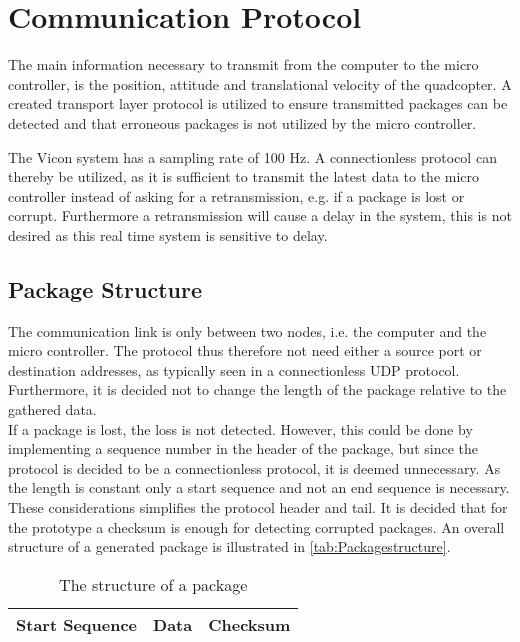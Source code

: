 \section{Communication Protocol}
The main information necessary to transmit from the computer to the micro controller, is the position, attitude and translational velocity of the quadcopter. A created transport layer protocol is utilized to ensure transmitted packages can be detected and that erroneous packages is not utilized by the micro controller.

The Vicon system has a sampling rate of 100 Hz. A connectionless protocol can thereby be utilized, as it is sufficient to transmit the latest data to the micro controller instead of asking for a retransmission, e.g. if a package is lost or corrupt. Furthermore a retransmission will cause a delay in the system, this is not desired as this real time system is sensitive to delay.

\subsection{Package Structure}
The communication link is only between two nodes, i.e. the computer and the micro controller. The protocol thus therefore not need either a source port or destination addresses, as typically seen in a connectionless UDP protocol. Furthermore, it is decided not to change the length of the package relative to the gathered data.\\
If a package is lost, the loss is not detected. However, this could be done by implementing a sequence number in the header of the package, but since the protocol is decided to be a connectionless protocol, it is deemed unnecessary. As the length is constant only a start sequence and not an end sequence is necessary. These considerations simplifies the protocol header and tail. It is decided that for the prototype a checksum is enough for detecting corrupted packages. An overall structure of a generated package is illustrated in \autoref{tab:Packagestructure}.

\begin{table}[H]\centering
\begin{tabular}{|>{\centering\arraybackslash}m{3cm}|>{\centering\arraybackslash}m{2cm}|>{\centering\arraybackslash}m{2cm}|}
\hline
Start Sequence & Data & Checksum \\
\hline
\end{tabular}
\caption{The structure of a package}
\label{tab:Packagestructure}
\end{table}

